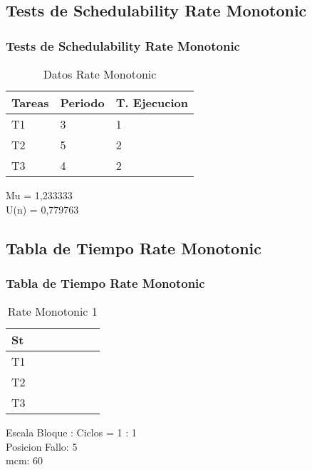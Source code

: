 \documentclass[xcolor=table]{beamer}
\begin{document}
\subsection{Tests de Schedulability  Rate Monotonic } 

\begin{frame} 
\frametitle{Tests de Schedulability  Rate Monotonic } 
\begin{table} 
\centering 
\begin{tabular}{|l|l|l|} 
\hline 
Tareas & Periodo & T. Ejecucion \\ \hline 
T1   & 3  &  1\\ \hline 
T2   & 5  &  2\\ \hline 
T3   & 4  &  2\\ \hline 
\end{tabular} 
\caption{Datos  Rate Monotonic } 
\end{table} 
Mu =  1,233333 \\ 
U(n) =  0,779763 \\ 
\end{frame} 

\subsection{Tabla de Tiempo  Rate Monotonic } 

\begin{frame} 
\frametitle{Tabla de Tiempo  Rate Monotonic } 
\begin{table} 
\centering 
\begin{tabular}{|l|l|l|l|l|l|l|} 
\hline 
St & \cellcolor{green} & \cellcolor{green} & \cellcolor{green} & \cellcolor{green} & \cellcolor{green} & \cellcolor{red} \\ \hline 
T1 & \cellcolor{blue} & & & \cellcolor{blue} & & \\ \hline 
T2 & & & & & & \\ \hline 
T3 & & \cellcolor{cyan} & \cellcolor{cyan} & & \cellcolor{cyan} & \cellcolor{cyan} \\ \hline 
\end{tabular} 
\caption{ Rate Monotonic 1 } 
\end{table} 
Escala Bloque : Ciclos = 1 : 1 \\ 
Posicion Fallo:  5 \\ 
mcm:  60 \\ 
\end{frame} 
\end{document}
